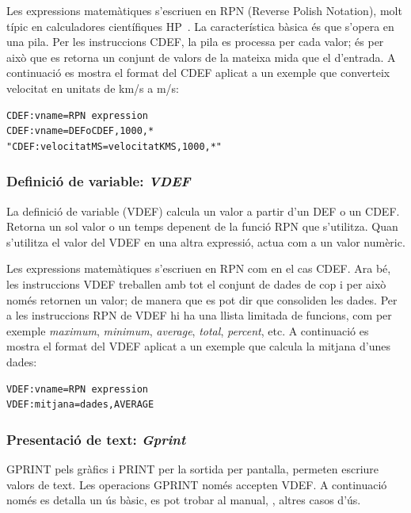 Les expressions matemàtiques s'escriuen en RPN (Reverse Polish Notation), molt típic en calculadores científiques HP~\cite{RPNhp}. La característica bàsica és que s'opera en una pila. Per les instruccions CDEF, la pila es processa per cada valor; és per això que es retorna un conjunt de valors de la mateixa mida que el d'entrada.
A continuació es mostra el format del CDEF aplicat a un exemple que converteix velocitat en unitats de km/s a m/s:
\begin{verbatim}
CDEF:vname=RPN expression
CDEF:vname=DEFoCDEF,1000,* 
"CDEF:velocitatMS=velocitatKMS,1000,*"
\end{verbatim}



\subsubsection{Definició de variable: \emph{VDEF}}

La definició de variable (VDEF) calcula un valor a partir d'un DEF o un CDEF.
Retorna un sol valor o un temps depenent de la funció RPN que s'utilitza. Quan s'utilitza el valor del VDEF en una altra expressió, actua com a un valor numèric. 

Les expressions matemàtiques s'escriuen en RPN com en el cas CDEF. Ara bé, les instruccions VDEF treballen amb tot el conjunt de dades de cop i per això només retornen un valor; de manera que es pot dir que consoliden les dades.
Per a les instruccions RPN de VDEF hi ha una llista limitada de funcions, com per exemple \emph{maximum}, \emph{minimum}, \emph{average}, \emph{total}, \emph{percent}, etc.
A continuació es mostra el format del VDEF aplicat a un exemple que calcula la mitjana d'unes dades:
\begin{verbatim}
VDEF:vname=RPN expression
VDEF:mitjana=dades,AVERAGE
\end{verbatim}



\subsubsection{Presentació de text: \emph{Gprint}}

GPRINT pels gràfics i PRINT per la sortida per pantalla, permeten escriure valors de text.
Les operacions GPRINT només accepten VDEF.%
A continuació només es detalla un ús bàsic, es pot trobar al manual, \cite{rrdtool_graph}, altres casos d'ús.

